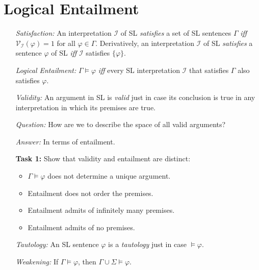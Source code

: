 \documentclass[a4paper, 11pt]{article} %
\newcommand{\set}[1]{\lbrace#1\rbrace} %
\newcommand{\I}{\mathcal{I}}
\newcommand{\V}[1]{\mathcal{V}_{#1}} %
\begin{document}
\section*{Logical Entailment}

\begin{enumerate}[leftmargin=1.2in,labelsep=.15in] %
  \item[\it Satisfaction:] An interpretation $\I$ of SL \textit{satisfies} a set of SL sentences $\Gamma$ \textit{iff} $\V{\I}(\varphi)=1$ for all $\varphi \in \Gamma$. Derivatively, an interpretation $\I$ of SL \textit{satisfies} a sentence $\varphi$ of SL \textit{iff} $\I$ satisfies $\set{\varphi}$.
  \item[\it Logical Entailment:] $\Gamma \vDash \varphi$ \textit{iff} every SL interpretation $\I$ that satisfies $\Gamma$ also satisfies $\varphi$.
  \item[\it Validity:] An argument in SL is \textit{valid} just in case its conclusion is true in any interpretation in which its premises are true.
  \item[\it Question:] How are we to describe the space of all valid arguments?
  \item[\it Answer:] In terms of entailment.
  \item[\bf Task 1:] Show that validity and entailment are distinct:
    \begin{itemize}
      \item $\Gamma \vDash \varphi$ does not determine a unique argument. 
      \item Entailment does not order the premises.
      \item Entailment admits of infinitely many premises.
      \item Entailment admits of no premises.
    \end{itemize}
  \item[\it Tautology:] An SL sentence $\varphi$ is a \textit{tautology} just in case $\vDash \varphi$.
  \item[\it Weakening:] If $\Gamma \vDash \varphi$, then $\Gamma \cup \Sigma \vDash \varphi$.
\end{enumerate}
\end{document}
